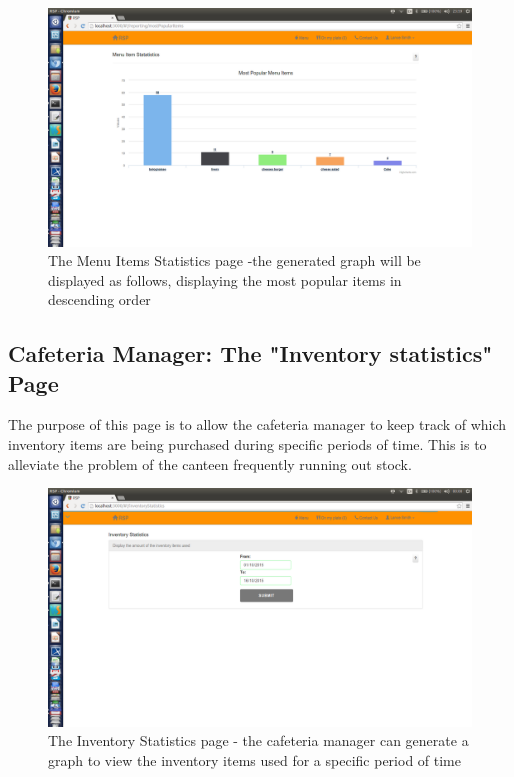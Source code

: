 \documentclass[a4paper,12pt]{report}
\begin{document}
\begin{figure}[H]
  \centering
    \includegraphics[width=1.0\textwidth]{screenshots/menuStats4.png}
    \caption{The Menu Items Statistics page -the generated graph will be displayed as follows, displaying the most popular items in descending order}
\end{figure}

\subsection{Cafeteria Manager: The "Inventory statistics" Page}
The purpose of this page is to allow the cafeteria manager to keep track of which inventory items are being purchased during specific periods of time. This is to alleviate the problem of the canteen frequently running out stock.

\begin{figure}[H]
  \centering
    \includegraphics[width=1.0\textwidth]{screenshots/invStats1.png}
    \caption{The Inventory Statistics page - the cafeteria manager can generate a graph to view the inventory items used for a specific period of time }
\end{figure}
\end{document}
